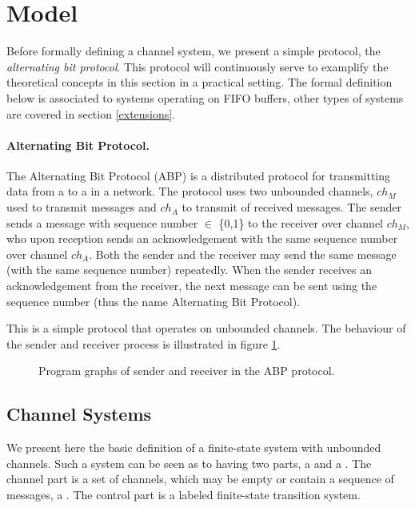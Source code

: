 \section{Model}
\label{definitions}
Before formally defining a channel system, we present a simple protocol, the \emph{alternating bit protocol}. This protocol will continuously serve to examplify the theoretical concepts in this section in a practical setting. The formal definition below is associated to systems operating on FIFO buffers, other types of systems are covered in section \ref{extensions}. 

\paragraph{Alternating Bit Protocol.} The Alternating Bit Protocol (ABP) is a distributed protocol for transmitting data from a  to a  in a network. The protocol uses two unbounded channels, $ch_M$ used to transmit messages and $ch_A$ to transmit  of received messages. The sender sends a message with sequence number  $\in$ \{0,1\} to the receiver over channel $ch_M$, who upon reception sends an acknowledgement with the same sequence number over channel $ch_A$. Both the sender and the receiver may send the same message (with the same sequence number) repeatedly. When the sender receives an acknowledgement from the receiver, the next message can be sent using the sequence number  (thus the name Alternating Bit Protocol).

This is a simple protocol that operates on unbounded channels. The behaviour of the sender and receiver process is illustrated in figure \ref{abpgraph}.

\begin{figure}[h!]
\subfloat[Sender]{\label{fig:in1}
\abpsender{}
}
\subfloat[Receiver]{\label{fig:in2}
\abpreceiver{}
}
\caption{Program graphs of sender and receiver in the ABP protocol.}
\label{abpgraph}
\end{figure}

\subsection{Channel Systems}
We present here the basic definition of a finite-state system with unbounded channels. Such a system can be seen as to having two parts, a  and a . The channel part is a set of channels, which may be empty or contain a sequence of messages, a . The control part is a labeled finite-state transition system. 

